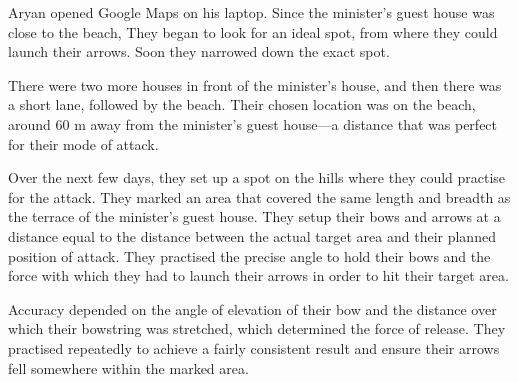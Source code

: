 Aryan opened Google Maps on his laptop. Since the minister's guest house was
close to the beach, They began to look for an ideal spot, from where they could
launch their arrows. Soon they narrowed down the exact spot.

There were two more houses in front of the minister's house, and then there was
a short lane, followed by the beach. Their chosen location was on the beach,
around 60 m away from the minister's guest house—a distance that was perfect
for their mode of attack.

Over the next few days, they set up a spot on the hills where they could practise
for the attack. They marked an area that covered the same length and breadth as the terrace of the minister's guest house. They setup their bows and arrows at a
distance equal to the distance between the actual target area and their planned
position of attack. They practised the precise angle to hold their bows and the
force with which they had to launch their arrows in order to hit their target area.

Accuracy depended on the angle of elevation of their bow and the distance over which their bowstring was stretched, which determined the force of release. They practised repeatedly
to achieve a fairly consistent result and ensure their arrows fell
somewhere within the marked area.